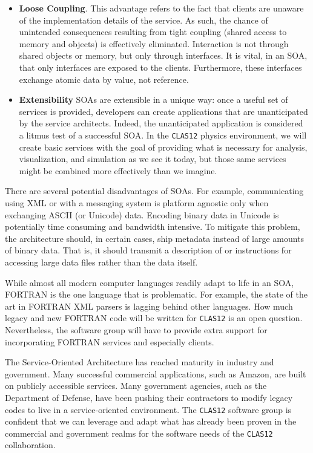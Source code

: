 \begin{itemize}
\item
{\bf Loose Coupling}. This advantage refers to the fact that clients are 
unaware of the implementation details of the service. As such, the chance of 
unintended consequences resulting from tight coupling (shared access to 
memory and objects) is effectively eliminated. Interaction is not through 
shared objects or memory, but only through interfaces. It is vital, in an SOA, 
that only interfaces are exposed to the clients. Furthermore, these interfaces 
exchange atomic data by value, not reference. 

\item
{\bf Extensibility}
SOAs are extensible in a unique way: once a useful set of services is 
provided, developers can create applications that are unanticipated by the 
service architects. Indeed, the unanticipated application is considered a 
litmus test of a successful SOA. In the {\tt CLAS12} physics environment, 
we will create basic services with the goal of providing what is necessary 
for analysis, visualization, and simulation as we see it today, but those 
same services might be combined more effectively than we imagine.
\end{itemize}

There are several potential disadvantages of SOAs. For example, 
communicating using XML or with a messaging system is platform agnostic only 
when exchanging ASCII (or Unicode) data. Encoding binary data in Unicode is 
potentially time consuming and bandwidth intensive. To mitigate this problem, 
the architecture should, in certain cases, ship metadata instead of large 
amounts of binary data. That is, it should transmit a description of or 
instructions for accessing large data files rather than the data itself. 

While almost all modern computer languages readily adapt to life in an SOA, 
FORTRAN is the one language that is problematic. For example, the state of 
the art in FORTRAN XML parsers is lagging behind other languages. How much 
legacy and new FORTRAN code will be written for {\tt CLAS12} is an open 
question. Nevertheless, the software group will have to provide extra 
support for incorporating FORTRAN services and especially clients.

The Service-Oriented Architecture has reached maturity in industry and 
government. Many successful commercial applications, such as Amazon, are 
built on publicly accessible services. Many government agencies, such as 
the Department of Defense, have been pushing their contractors to modify 
legacy codes to live in a service-oriented environment. The {\tt CLAS12}
software group is confident that we can leverage and adapt what has already 
been proven in the commercial and government realms for the software 
needs of the {\tt CLAS12} collaboration. 


